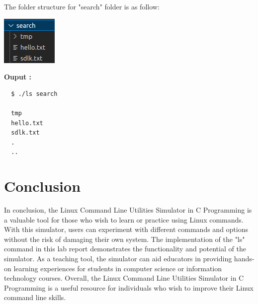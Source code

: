 \documentclass[journal,onecolumn]{IEEEtran}
\begin{document}
The folder structure for "search" folder is as follow:
\newline

\includegraphics[scale=1.5]{search.png}


\textbf{Ouput :}
\begin{verbatim}
  $ ./ls search

  tmp
  hello.txt
  sdlk.txt
  .
  ..
\end{verbatim}




\section{Conclusion}
In conclusion, the Linux Command Line Utilities Simulator in C Programming is a valuable tool for those who wish to learn or practice using Linux commands. With this simulator, users can experiment with different commands and options without the risk of damaging their own system. The implementation of the "ls" command in this lab report demonstrates the functionality and potential of the simulator. As a teaching tool, the simulator can aid educators in providing hands-on learning experiences for students in computer science or information technology courses. Overall, the Linux Command Line Utilities Simulator in C Programming is a useful resource for individuals who wish to improve their Linux command line skills.
\end{document}

